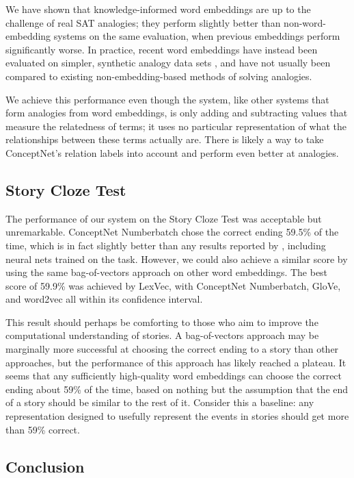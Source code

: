 \documentclass[letterpaper]{article}
\begin{document}
We have shown that knowledge-informed word embeddings are up to the challenge
of real SAT analogies; they perform slightly better than non-word-embedding
systems on the same evaluation, when previous embeddings perform significantly
worse. In practice, recent word embeddings have instead been evaluated on
simpler, synthetic analogy data sets \cite{mikolov2013word2vec}, and have not
usually been compared to existing non-embedding-based methods of solving
analogies.

We achieve this performance even though the system, like other systems that
form analogies from word embeddings, is only adding and subtracting values that
measure the relatedness of terms; it uses no particular representation of what
the relationships between these terms actually are. There is likely a way to
take ConceptNet's relation labels into account and perform even better at
analogies.

\subsection{Story Cloze Test}

The performance of our system on the Story Cloze Test was acceptable but
unremarkable. ConceptNet Numberbatch chose the correct ending 59.5\% of the
time, which is in fact slightly better than any results reported by
\citeauthor{mostafazadeh2016cloze} , including
neural nets trained on the task. However, we could also achieve a similar score
by using the same bag-of-vectors approach on other word embeddings. The best
score of 59.9\% was achieved by LexVec, with ConceptNet Numberbatch, GloVe, and
word2vec all within its confidence interval.

This result should perhaps be comforting to those who aim to improve the
computational understanding of stories. A bag-of-vectors approach may be
marginally more successful at choosing the correct ending to a story than other
approaches, but the performance of this approach has likely reached a plateau.
It seems that any sufficiently high-quality word embeddings can choose the
correct ending about 59\% of the time, based on nothing but the assumption that
the end of a story should be similar to the rest of it. Consider this a
baseline: any representation designed to usefully represent the events in
stories should get more than 59\% correct.

\subsection{Conclusion}
\end{document}
